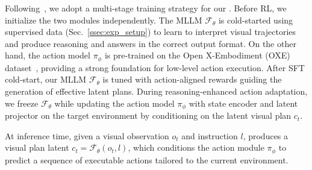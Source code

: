 Following~\cite{feng2025video}, we adopt a multi-stage training strategy for our \ours{}. Before RL, we initialize the two modules independently. The MLLM $\mathcal{F}_\theta$ is cold-started using supervised data (Sec.~\ref{ssec:exp_setup}) to learn to interpret visual trajectories and produce reasoning and answers in the correct output format. On the other hand, the action model $\pi_\phi$ is pre-trained on the Open X-Embodiment (OXE) dataset~\cite{o2024open}, providing a strong foundation for low-level action execution.
After SFT cold-start, our MLLM $\mathcal{F}_\theta$ is tuned with action-aligned rewards guiding the generation of effective latent plans. During reasoning-enhanced action adaptation, we freeze $\mathcal{F}_\theta$ while updating the action model $\pi_\phi$ with state encoder and latent projector on the target environment by conditioning on the latent visual plan $c_t$.

At inference time, given a visual observation $o_t$ and instruction $l$, \ours{} produces a visual plan latent $c_t = \mathcal{F}_\theta(o_t, l)$, which conditions the action module $\pi_\phi$ to predict a sequence of executable actions tailored to the current environment.